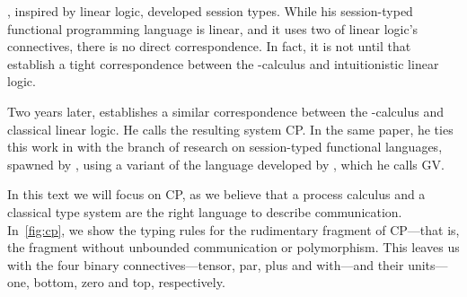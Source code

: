 \documentclass[twocolumn]{article}
\begin{document}
\citet{honda1993}, inspired by linear logic, developed session types.
While his session-typed functional programming language is linear, and it uses
two of linear logic's connectives, there is no direct correspondence.
In fact, it is not until \citeyear{caires2010} that \citeauthor{caires2010}
establish a tight correspondence between the \textpi-calculus and intuitionistic
linear logic.

Two years later, \citet{wadler2012} establishes a similar correspondence between
the \textpi-calculus and classical linear logic. He calls the resulting system
CP. In the same paper, he ties this work in with the branch of research on
session-typed functional languages, spawned by \citet{honda1993}, using a
variant of the language developed by \citet{gay2009}, which he calls GV.

In this text we will focus on CP, as we believe that a process calculus and a
classical type system are the right language to describe communication.
In~\autoref{fig:cp}, we show the typing rules for the rudimentary fragment of
CP---that is, the fragment without unbounded communication or polymorphism.
This leaves us with the four binary connectives---tensor, par, plus and
with---and their units---one, bottom, zero and top, respectively.
\end{document}
